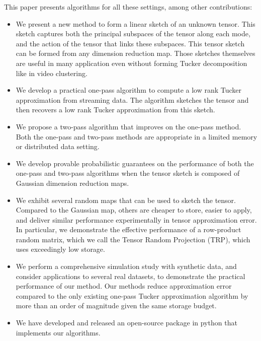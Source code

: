 This paper presents algorithms for all these settings,
among other contributions:
\begin{itemize}
	\item We present a new method to form a linear sketch of an unknown tensor.  This sketch captures both the principal subspaces of the tensor along each mode, and the action of the tensor that links these subspaces.
	This tensor sketch can be formed from any	dimension reduction map. Those sketches themselves  are useful in many application even without forming Tucker decomposition like in video clustering. 

	\item We develop a practical one-pass algorithm
	to compute a low rank Tucker approximation from streaming data.
	The algorithm sketches the tensor and then recovers a low rank Tucker approximation from this sketch.

	\item We propose a two-pass algorithm that improves on the  one-pass method.
	Both the one-pass and two-pass methods are appropriate in a limited memory or distributed data setting.

	\item We develop provable probabilistic guarantees on the performance of both the
	one-pass and two-pass algorithms
	when the tensor sketch is composed of Gaussian dimension reduction maps.

	\item We exhibit several random maps that can be used to sketch the tensor.
	Compared to the Gaussian map,
	others are cheaper to store, easier to apply, and deliver similar performance
	experimentally in tensor approximation error.
	In particular, we demonstrate the effective performance of a
	row-product random matrix, which we call the Tensor Random Projection (TRP),
	which uses exceedingly low storage.

	\item We perform a comprehensive simulation study with synthetic data,
	and consider applications to several real datasets,
	to demonstrate the practical performance of our method.
	Our methods reduce approximation error compared to
	the only existing one-pass Tucker approximation algorithm \citep{malik2018low}
	by more than an order of magnitude given the same storage budget.

	\item We have developed and released an open-source package in python that implements our algorithms.
\end{itemize}

